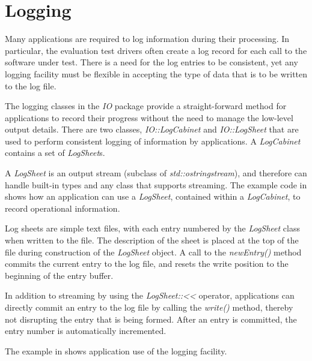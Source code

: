 \section{Logging}
\label{sec-logging}

Many applications are required to log information during their processing. In
particular, the evaluation test drivers often create a log record for each
call to the software under test. There is a need for the log entries to be
consistent, yet any logging facility must be flexible in accepting the type of
data that is to be written to the log file.

The logging classes in the {\em IO} package provide a straight-forward method
for applications to record their progress without the need to manage the
low-level output details.
There are two classes, {\em IO::LogCabinet} and {\em IO::LogSheet} that are used
to perform consistent logging of information by applications. A {\em LogCabinet}
contains a set of {\em LogSheet}s.

A {\em LogSheet} is an output stream (subclass of {\em std::ostringstream}),
and therefore can handle built-in types and any class that supports streaming.
The example code in  shows how an application can use a
{\em LogSheet}, contained within a {\em LogCabinet}, to record operational
information.

Log sheets are simple text files, with each entry numbered by the {\em LogSheet}
class when written to the file. The description of the sheet is placed at the
top of the file during construction of the {\em LogSheet} object. A call to the
{\em newEntry()} method commits the current entry to the log file, and resets
the write position to the beginning of the entry buffer.

In addition to streaming by using the {\em LogSheet::<<} operator, applications
can directly commit an entry to the log file by calling the {\em write()}
method, thereby not disrupting the entry that is being formed. After an entry
is committed, the entry number is automatically incremented.

The example in  shows application use of the
logging facility.

